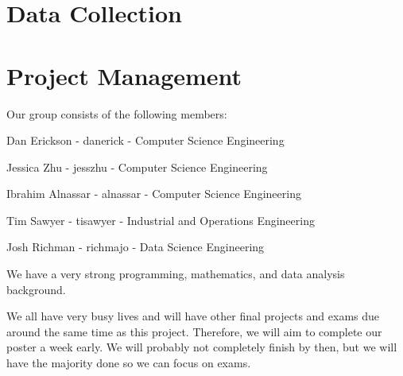 \documentclass[12pt]{article}
\begin{document}
\section{Data Collection}


\section{Project Management}

Our group consists of the following members:

\begin{list}{}{}
	\item Dan Erickson - danerick - Computer Science Engineering
	\item Jessica Zhu - jesszhu - Computer Science Engineering
	\item Ibrahim Alnassar - alnassar - Computer Science Engineering
	\item Tim Sawyer - tisawyer - Industrial and Operations Engineering
	\item Josh Richman - richmajo - Data Science Engineering
\end{list}

We have a very strong programming, mathematics, and data analysis background.


We all have very busy lives and will have other final projects and exams due around the same time as this project. Therefore, we will aim to complete our poster a week early. We will probably not completely finish by then, but we will have the majority done so we can focus on exams.
\end{document}
